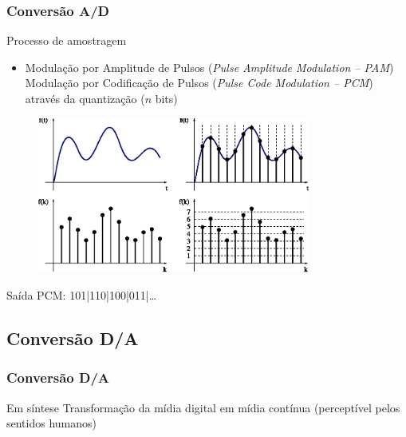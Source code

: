 \documentclass[xcolor]{beamer}
\begin{document}
\begin{frame}
    \frametitle{Conversão A/D}

    Processo de amostragem

    \begin{itemize}
        \item Modulação por Amplitude de Pulsos ({\it Pulse Amplitude Modulation
              -- PAM}) \implica Modulação por Codificação de Pulsos ({\it Pulse
              Code Modulation -- PCM}) através da quantização ($n$ bits)
    \end{itemize}

    \begin{figure}[htb]
    \centering
        \includegraphics[width=0.8\textwidth]{imgs/pcm}
    \end{figure}

    \scriptsize
    Saída PCM: 101|110|100|011|\ldots

\end{frame}


\subsection{Conversão D/A}
\begin{frame}
    \frametitle{Conversão D/A}

    Em síntese \implica Transformação da mídia digital em mídia contínua
    (perceptível pelos sentidos humanos)


\end{frame}
\end{document}

